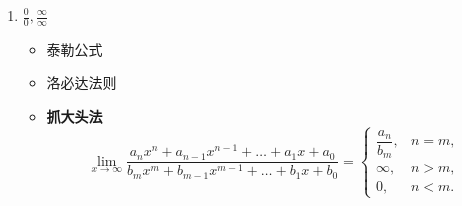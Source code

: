 \documentclass[../book.tex]{subfiles}
\begin{document}
\begin{enumerate}
\begin{itemize}
        \end{itemize}
        \item $\displaystyle\frac{0}{0}, \frac{\infty}{\infty}$
        \begin{itemize}
            \item 泰勒公式
            \item 洛必达法则
            \item \textbf{抓大头法}
            \[
                \lim_{x \to \infty}
                \frac{a_nx^n + a_{n-1}x^{n-1} + \dots + a_1x + a_0}
                {b_mx^m + b_{m-1}x^{m-1} + \dots + b_1x + b_0}
                =
                \begin{cases}
                    \dfrac{a_n}{b_m}, & n = m,\\[1.5mm]
                    \infty, & n > m,\\[1mm]
                    0, & n < m.
                \end{cases}
            \]


\end{itemize}
\end{enumerate}
\end{document}
